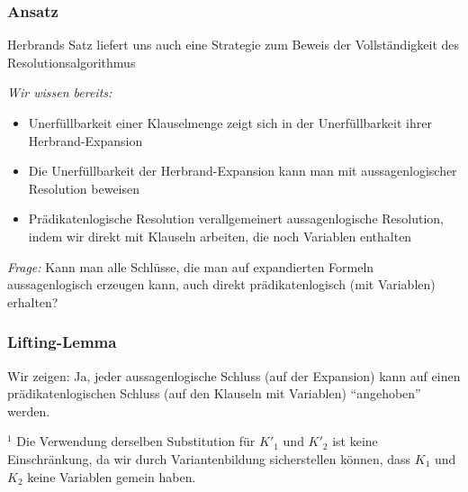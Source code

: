 \documentclass[aspectratio=1610,onlymath]{beamer}
\begin{document}

\begin{frame}\frametitle{Ansatz}

\alert{Herbrands Satz liefert uns auch eine Strategie zum Beweis der Vollständigkeit des Resolutionsalgorithmus}\bigskip

\emph{Wir wissen bereits:}
\begin{itemize}
\item Unerfüllbarkeit einer Klauselmenge zeigt sich in der Unerfüllbarkeit ihrer Herbrand-Expansion
\item Die Unerfüllbarkeit der Herbrand-Expansion kann man mit aussagenlogischer Resolution beweisen
\item Prädikatenlogische Resolution verallgemeinert aussagenlogische Resolution, indem wir direkt mit Klauseln arbeiten, die noch Variablen enthalten
\end{itemize}\pause

\emph{Frage:} Kann man alle Schlüsse, die man auf expandierten Formeln aussagenlogisch erzeugen kann, auch direkt prädikatenlogisch (mit Variablen) erhalten?

\end{frame}

\begin{frame}\frametitle{Lifting-Lemma}

Wir zeigen: Ja, jeder aussagenlogische Schluss (auf der Expansion) kann auf einen prädikatenlogischen Schluss (auf den Klauseln mit Variablen) "`angehoben"' werden.\medskip


\color{devilscss}
{\footnotesize ${^1}$ Die Verwendung derselben Substitution für $K'_1$ und $K'_2$ ist keine Einschränkung, da wir durch Variantenbildung sicherstellen können, dass $K_1$ und $K_2$ keine Variablen gemein haben.

}

\end{frame}
\end{document}
